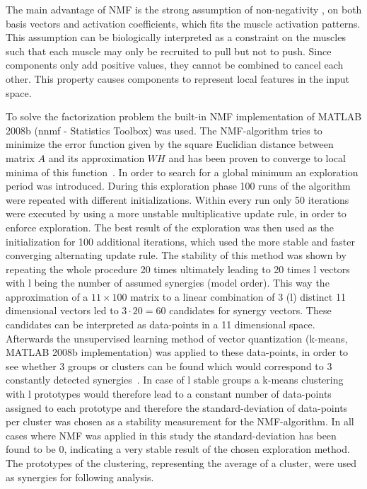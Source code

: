 The main advantage of NMF is the strong assumption of non-negativity \citep{Lee:1999p1635}, on both basis vectors and activation coefficients, which fits the muscle activation patterns. This assumption can be biologically interpreted as a constraint on the muscles such that each muscle may only be recruited to pull but not to push. Since components only add positive values, they cannot be combined to cancel each other. This property causes components to represent local features in the input space.

To solve the factorization problem the built-in NMF implementation of MATLAB 2008b (nnmf - Statistics Toolbox) was used. The NMF-algorithm tries to minimize the error function given by the square Euclidian distance between matrix $A$ and its approximation $WH$ and has been proven to converge to local minima of this function~\citep{Lee:2001p1638}. In order to search for a global minimum an exploration period was introduced. During this exploration phase 100 runs of the algorithm were repeated with different initializations. Within every run only 50 iterations were executed by using a more unstable multiplicative update rule, in order to enforce exploration. The best result of the exploration was then used as the initialization for 100 additional iterations, which used the more stable and faster converging alternating update rule. The stability of this method was shown by repeating the whole procedure 20 times ultimately leading to 20 times l vectors with l being the number of assumed synergies (model order). This way the approximation of a $11 \times 100$ matrix to a linear combination of 3 (l) distinct 11 dimensional vectors led to $3 \cdot 20 = 60$ candidates for synergy vectors. These candidates can be interpreted as data-points in a 11 dimensional space. Afterwards the unsupervised learning method of vector quantization (k-means, MATLAB 2008b implementation) was applied to these data-points, in order to see whether 3 groups or clusters can be found which would correspond to 3 constantly detected synergies~. In case of l stable groups a k-means clustering with l prototypes would therefore lead to a constant number of data-points assigned to each prototype and therefore the standard-deviation of data-points per cluster was chosen as a stability measurement for the NMF-algorithm. In all cases where NMF was applied in this study the standard-deviation has been found to be 0, indicating a very stable result of the chosen exploration method. The prototypes of the clustering, representing the average of a cluster, were used as synergies for following analysis.
